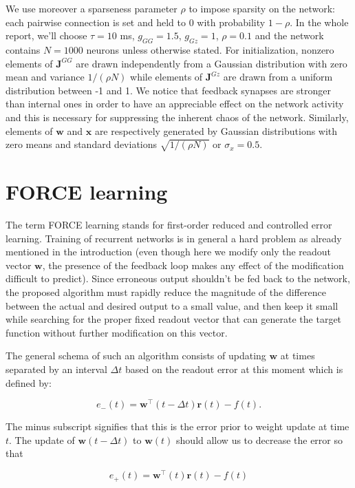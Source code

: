 We use moreover a sparseness parameter $\rho$ to impose sparsity on the 
network: each pairwise connection is set and held to 0 with probability 
$1 - \rho$. In the whole report, we'll choose $\tau=10$ ms, $g_{GG} = 1.5$,
$g_{Gz} = 1$, $\rho = 0.1$ and the network contains $N=1000$ neurons unless 
otherwise stated. For initialization, nonzero elements of $\mathbf{J}^{GG}$ 
are drawn independently from a Gaussian distribution with zero mean and 
variance $1/(\rho N)$ while elements of $\mathbf{J}^{Gz}$ are drawn from 
a uniform distribution between -1 and 1. We notice that feedback synapses 
are stronger than internal ones in order to have an appreciable effect on the
network activity and this is necessary for suppressing the inherent
chaos of the network. Similarly, elements of $\mathbf{w}$ and 
$\mathbf{x}$ are respectively generated by Gaussian distributions with zero 
means and standard deviations $\sqrt{1/(\rho N)}$ or $\sigma_x = 0.5$.


\section{FORCE learning}

The term FORCE learning stands for first-order reduced and controlled error
learning. Training of recurrent networks is in general a hard problem as 
already mentioned in the introduction (even though here we modify only
the readout vector $\mathbf{w}$, the presence of the feedback loop makes
any effect of the modification difficult to predict). Since erroneous output
shouldn't be fed back to the network, the proposed algorithm must rapidly 
reduce the magnitude of the difference between the actual and desired output
to a small value, and then keep it small while searching for the proper
fixed readout vector that can generate the target function without further
modification on this vector.

The general schema of such an algorithm consists of updating $\mathbf{w}$
at times separated by an interval $\Delta t$ based on the readout error
at this moment which is defined by:

\[e_-(t) = \mathbf{w}^{\top}(t-\Delta t)\mathbf{r}(t) - f(t).\]

\noindent
The minus subscript signifies that this is the error prior to weight update 
at time $t$. The update of $\mathbf{w}(t-\Delta t)$ to $\mathbf{w}(t)$ should
allow us to decrease the error so that

\[e_+(t) = \mathbf{w}^{\top}(t)\mathbf{r}(t) - f(t)\]

